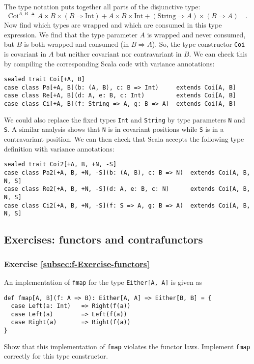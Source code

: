 The type notation puts together all parts of the disjunctive type:
\[
\text{Coi}^{A,B}\triangleq A\times B\times(B\Rightarrow\text{Int})+A\times B\times\text{Int}+(\text{String}\Rightarrow A)\times(B\Rightarrow A)\quad.
\]
Now find which types are wrapped and which are consumed in this type
expression. We find that the type parameter $A$ is wrapped and never
consumed, but $B$ is both wrapped and consumed (in $B\Rightarrow A$).
So, the type constructor \lstinline!Coi! is covariant in $A$ but
neither covariant nor contravariant in $B$. We can check this by
compiling the corresponding Scala code with variance annotations:
\begin{lstlisting}
sealed trait Coi[+A, B]
case class Pa[+A, B](b: (A, B), c: B => Int)     extends Coi[A, B]
case class Re[+A, B](d: A, e: B, c: Int)         extends Coi[A, B]
case class Ci[+A, B](f: String => A, g: B => A)  extends Coi[A, B]
\end{lstlisting}
We could also replace the fixed types \lstinline!Int! and \lstinline!String!
by type parameters \lstinline!N! and \lstinline!S!. A similar analysis
shows that \lstinline!N! is in covariant positions while \lstinline!S!
is in a contravariant position. We can then check that Scala accepts
the following type definition with variance annotations:
\begin{lstlisting}
sealed trait Coi2[+A, B, +N, -S]
case class Pa2[+A, B, +N, -S](b: (A, B), c: B => N)  extends Coi[A, B, N, S]
case class Re2[+A, B, +N, -S](d: A, e: B, c: N)      extends Coi[A, B, N, S]
case class Ci2[+A, B, +N, -S](f: S => A, g: B => A)  extends Coi[A, B, N, S]
\end{lstlisting}


\subsection{Exercises: functors and contrafunctors}

\subsubsection{Exercise \label{subsec:f-Exercise-functors}\ref{subsec:f-Exercise-functors}}

An implementation of \lstinline!fmap! for the type \lstinline!Either[A, A]!
is given as
\begin{lstlisting}
def fmap[A, B](f: A => B): Either[A, A] => Either[B, B] = {
  case Left(a: Int)   => Right(f(a))
  case Left(a)        => Left(f(a))
  case Right(a)       => Right(f(a))
}
\end{lstlisting}
Show that this implementation of \lstinline!fmap! violates the functor
laws. Implement \lstinline!fmap! correctly for this type constructor.

